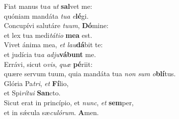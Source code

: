 \oddverse Fiat manus tu\textit{a} \textit{ut} \textbf{sal}vet me:~\*\\
\oddverse quóniam mandáta \textit{tu}\textit{a} \textit{e}\textbf{lé}gi.\\
\evenverse Concupívi salutáre \textit{tu}\textit{um}, \textbf{Dó}mine:~\*\\
\evenverse et lex tua medi\textit{tá}\textit{ti}\textit{o} \textbf{me}\textbf{a} est.\\
\oddverse Vivet ánima mea, \textit{et} \textit{lau}\textbf{dá}bit te:~\*\\
\oddverse et judícia tu\textit{a} \textit{ad}\textit{ju}\textbf{vá}\textbf{bunt} me.\\
\evenverse Errávi, sicut o\textit{vis}, \textit{quæ} \textbf{pé}riit:~\*\\
\evenverse quære servum tuum, quia mandáta tua \textit{non} \textit{sum} \textit{o}\textbf{blí}tus.\\
\oddverse Glória Pa\textit{tri}, \textit{et} \textbf{Fí}lio,~\*\\
\oddverse et Spi\textit{rí}\textit{tu}\textit{i} \textbf{San}cto.\\
\evenverse Sicut erat in princípio, et \textit{nunc}, \textit{et} \textbf{sem}per,~\*\\
\evenverse et in sǽcula sæ\textit{cu}\textit{ló}\textit{rum}. \textbf{A}men.\\
